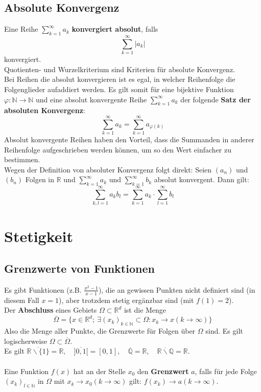 \documentclass[a4paper,10pt]{scrartcl}
\begin{document}
\subsection{Absolute Konvergenz}
Eine Reihe $\sum_{k=1}^{\infty} a_k$ \textbf{konvergiert absolut}, falls 
\begin{equation}
\sum_{k=1}^{\infty} |a_k|
\end{equation} konvergiert. \\
Quotienten- und Wurzelkriterium sind Kriterien für absolute Konvergenz. \\
Bei Reihen die absolut konvergieren ist es egal, in welcher Reihenfolge die Folgenglieder aufaddiert werden. Es gilt somit für eine bijektive Funktion $\varphi:\mathbb{N}\to \mathbb{N}$ und eine absolut konvergente Reihe $\sum_{k=1}^{\infty}a_k$ der folgende \textbf{Satz der absoluten Konvergenz}:
\begin{equation}
	 \sum_{k=1}^{\infty}a_k = 
	 \sum_{k=1}^{\infty}a_{\varphi(k)} 
\end{equation}
Absolut konvergente Reihen haben den Vorteil, dass die Summanden in anderer Reihenfolge aufgeschrieben werden können, um so den Wert einfacher zu bestimmen. \\
Wegen der Definition von absoluter Konvergenz folgt direkt: Seien $(a_n)$ und $(b_n)$ Folgen in $\mathbb{R}$ und $\sum_{k=1}^{\infty} a_k$ und $\sum_{k=1}^{\infty} b_k$ absolut konvergent. Dann gilt: 
\begin{equation}
	\sum_{k,l=1}^{\infty} a_kb_l = 
	\sum_{k=1}^{\infty} a_k \cdot
	\sum_{l=1}^{\infty} b_l
\end{equation}

\section{Stetigkeit}
\subsection{Grenzwerte von Funktionen}
Es gibt Funktionen (z.B. $\frac{x^2-1}{x-1}$), die an gewissen Punkten nicht definiert sind (in diesem Fall $x=1$), aber trotzdem stetig ergänzbar sind (mit $f(1)=2$). \\
Der \textbf{Abschluss} eines Gebiets $\Omega\subset \mathbb{R}^d$ ist die Menge
\begin{equation}
	\overline{\Omega} = \{ x\in\mathbb{R}^d; \ \exists (x_k)_{k\in\mathbb{N}} \subset \Omega: x_k\to x (k\to \infty) \}
\end{equation}
Also die Menge aller Punkte, die Grenzwerte für Folgen über $\Omega$ sind. Es gilt logischerweise $\Omega \subset \overline{\Omega}$.\\
Es gilt $\overline{\mathbb{R}\backslash \{1\}}=\mathbb{R},\quad \overline{]0,1[}= [0,1],\quad \overline{\mathbb{Q}} = \mathbb{R}, \quad \overline{\mathbb{R}\backslash \mathbb{Q}}=\mathbb{R}$.\\\\
Eine Funktion $f(x)$ hat an der Stelle $x_0$ den \textbf{Grenzwert} $a$, falls für jede Folge $(x_k)_{l\in\mathbb{N}}$ in $\Omega$ mit $x_k\to x_0 (k\to \infty) $ gilt: $f(x_k)\to a (k\to \infty)$. \\
\end{document}
